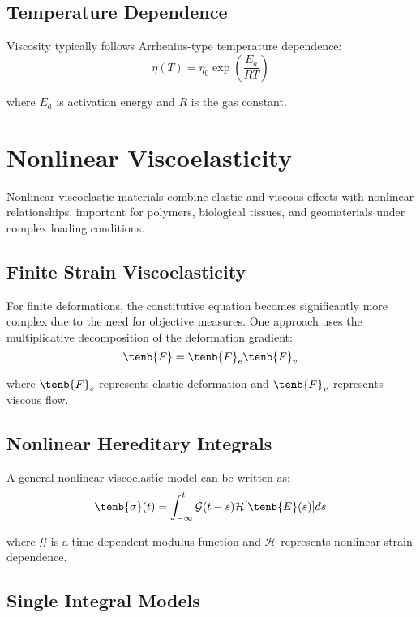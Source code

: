 \subsection{Temperature Dependence}

Viscosity typically follows Arrhenius-type temperature dependence:
\begin{equation}
\eta(T) = \eta_0 \exp\left(\frac{E_a}{RT}\right)
\end{equation}

where $E_a$ is activation energy and $R$ is the gas constant.

\section{Nonlinear Viscoelasticity}

Nonlinear viscoelastic materials combine elastic and viscous effects with nonlinear relationships, important for polymers, biological tissues, and geomaterials under complex loading conditions.

\subsection{Finite Strain Viscoelasticity}

For finite deformations, the constitutive equation becomes significantly more complex due to the need for objective measures. One approach uses the multiplicative decomposition of the deformation gradient:
\begin{equation}
\tenb{F} = \tenb{F}_e \tenb{F}_v
\end{equation}

where $\tenb{F}_e$ represents elastic deformation and $\tenb{F}_v$ represents viscous flow.

\subsection{Nonlinear Hereditary Integrals}

A general nonlinear viscoelastic model can be written as:
\begin{equation}
\tenb{\sigma}(t) = \int_{-\infty}^t \mathcal{G}(t-s) \mathcal{H}[\tenb{E}(s)] ds
\end{equation}

where $\mathcal{G}$ is a time-dependent modulus function and $\mathcal{H}$ represents nonlinear strain dependence.

\subsection{Single Integral Models}

